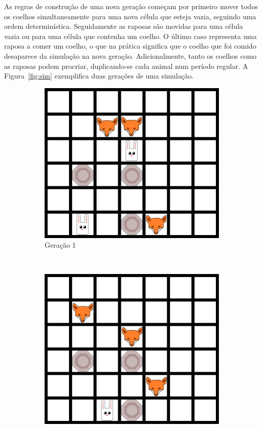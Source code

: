 \documentclass[10pt,a4paper,oneside]{article}
\begin{document}
As regras de construção de uma nova geração começam por primeiro mover
todos os coelhos simultaneamente para uma nova célula que esteja
vazia, seguindo uma ordem determinística. Seguidamente as raposas são
movidas para uma célula vazia ou para uma célula que contenha um
coelho. O último caso representa uma raposa a comer um coelho, o que
na prática significa que o coelho que foi comido desaparece da
simulação na nova geração. Adicionalmente, tanto os coelhos como as
raposas podem procriar, duplicando-se cada animal num período
regular. A Figura~\ref{fig:sim} exemplifica duas gerações de uma
simulação.

\begin{figure}
    \centering
    \begin{subfigure}[b]{0.3\textwidth}
        \includegraphics[width=\textwidth]{grid1.png}
        \caption{Geração 1}
    \end{subfigure}
    ~
    \begin{subfigure}[b]{0.3\textwidth}
      \includegraphics[width=\textwidth]{grid2.png}

\end{subfigure}
\end{figure}
\end{document}
